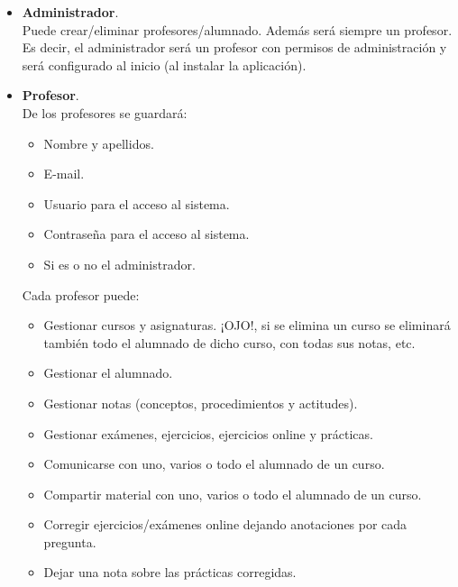 \documentclass[12pt,twoside,a4paper]{article}
\begin{document}
\begin{itemize}
\item \textbf{Administrador}.\\
Puede crear/eliminar profesores/alumnado. Además será siempre un profesor. Es decir, el administrador será un profesor con permisos de administración y será configurado al inicio (al instalar la aplicación).

\item \textbf{Profesor}.\\
De los profesores se guardará:
\begin{itemize}
\item Nombre y apellidos.
\item E-mail.
\item Usuario para el acceso al sistema.
\item Contraseña para el acceso al sistema.
\item Si es o no el administrador.
\end{itemize}
Cada profesor puede:
\begin{itemize}
\item Gestionar cursos y asignaturas. ¡OJO!, si se elimina un curso se eliminará también todo el alumnado de dicho curso, con todas sus notas, etc.
\item Gestionar el alumnado.
\item Gestionar notas (conceptos, procedimientos y actitudes).
\item Gestionar exámenes, ejercicios, ejercicios online y prácticas.
\item Comunicarse con uno, varios o todo el alumnado de un curso.
\item Compartir material con uno, varios o todo el alumnado de un curso.
\item Corregir ejercicios/exámenes online dejando anotaciones por cada pregunta.
\item Dejar una nota sobre las prácticas corregidas.
\end{itemize}


\end{itemize}
\end{document}

